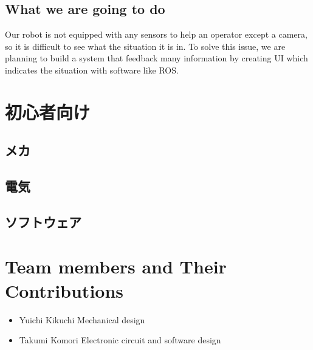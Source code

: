 \documentclass[journal]{IEEEtran}
\begin{document}
\subsection{What we are going to do}
Our robot is not equipped with any sensors to help an operator except a camera, so it is difficult to see what the situation it is in.
To solve this issue, we are planning to build a system that feedback many information by creating UI which indicates the situation with software like ROS.

\section{初心者向け}
\subsection{メカ}
\subsection{電気}
\subsection{ソフトウェア}

\appendices

\section{Team members and Their Contributions}
\begin{itemize}
    \item Yuichi Kikuchi \hfill Mechanical design
    \item Takumi Komori \hfill Electronic circuit and software design
\end{itemize}
\end{document}
